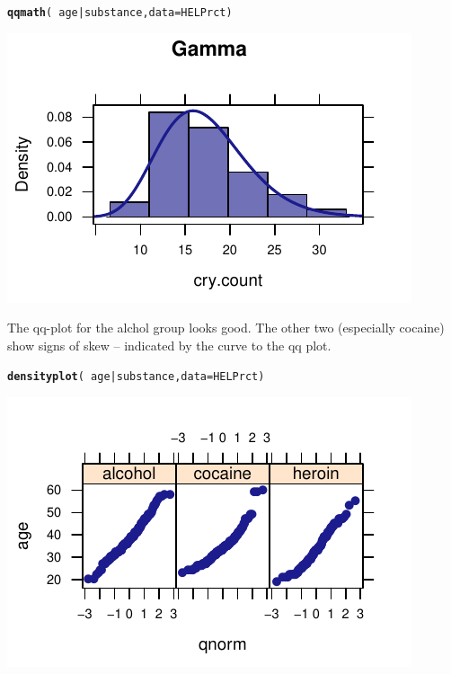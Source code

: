 \documentclass[twoside]{book}\usepackage[]{graphicx}\usepackage[]{xcolor}
\makeatletter
\def\maxwidth{ %
  \ifdim\Gin@nat@width>\linewidth
    \linewidth
  \else
    \Gin@nat@width
  \fi
}
\newcommand{\hlopt}[1]{\textcolor[rgb]{0,0,0}{#1}}%
\newcommand{\hlstd}[1]{\textcolor[rgb]{0.345,0.345,0.345}{#1}}%
\newcommand{\hlkwc}[1]{\textcolor[rgb]{0.333,0.667,0.333}{#1}}%
\newcommand{\hlkwd}[1]{\textcolor[rgb]{0.737,0.353,0.396}{\textbf{#1}}}%
\newenvironment{kframe}{%
 \def\at@end@of@kframe{}%
 \ifinner\ifhmode%
  \def\at@end@of@kframe{\end{minipage}}%
  \begin{minipage}{\columnwidth}%
 \fi\fi%
 \def\FrameCommand##1{\hskip\@totalleftmargin \hskip-\fboxsep
 \colorbox{shadecolor}{##1}\hskip-\fboxsep
     \hskip-\linewidth \hskip-\@totalleftmargin \hskip\columnwidth}%
 \MakeFramed {\advance\hsize-\width
   \@totalleftmargin\z@ \linewidth\hsize
   \@setminipage}}%
 {\par\unskip\endMakeFramed%
 \at@end@of@kframe}
\newenvironment{knitrout}{}{} %
\makeatother
\begin{document}
\begin{solution}
\begin{knitrout}
\color{fgcolor}\begin{kframe}
\begin{alltt}
\hlkwd{qqmath}\hlstd{(} \hlopt{~} \hlstd{age} \hlopt{|} \hlstd{substance,} \hlkwc{data}\hlstd{=HELPrct )}
\end{alltt}
\end{kframe}

{\centering \includegraphics[width=\maxwidth]{figures/fig-unnamed-chunk-120-1} 

}



\end{knitrout}
The qq-plot for the alchol group looks good.  The other two (especially cocaine) show
signs of skew -- indicated by the curve to the qq plot.
\begin{knitrout}
\color{fgcolor}\begin{kframe}
\begin{alltt}
\hlkwd{densityplot}\hlstd{(} \hlopt{~} \hlstd{age} \hlopt{|} \hlstd{substance,} \hlkwc{data}\hlstd{=HELPrct )}
\end{alltt}
\end{kframe}

{\centering \includegraphics[width=\maxwidth]{figures/fig-unnamed-chunk-121-1} 

}



\end{knitrout}
\end{solution}
\end{document}
